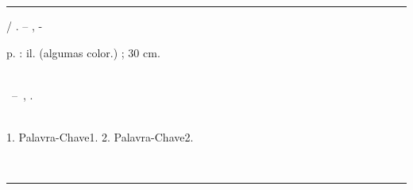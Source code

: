 \documentclass[
	12pt,				%
	oneside,
	a4paper,			%
    sumario=tradicional,%
	chapter=TITLE,		%
	english,			%
	french,				%
	spanish,			%
	brazil,				%
	]{abntex2}
\begin{document}
\frenchspacing 


\imprimircapa

\imprimirfolhaderosto*


%
%     
\begin{fichacatalografica}
	\vspace*{\fill}					%
	\hrule							%
	\begin{center}					%
	\begin{minipage}[c]{12.5cm}		%
	
	\imprimirautor
	
	\hspace{0.5cm} \imprimirtitulo  / \imprimirautor. --
	\imprimirlocal, \imprimirdata-
	
	\hspace{0.5cm} \pageref{LastPage} p. : il. (algumas color.) ; 30 cm.\\
	
	\hspace{0.5cm} \imprimirorientadorRotulo~\imprimirorientador\\
	
	\hspace{0.5cm}
	\parbox[t]{\textwidth}{\imprimirtipotrabalho~--~\imprimirinstituicao,
	\imprimirdata.}\\
	
	\hspace{0.5cm}
		1. Palavra-Chave1.
		2. Palavra-Chave2.
	
	\hspace{8.75cm}\\
	
	\end{minipage}
	\end{center}
	\hrule
\end{fichacatalografica}
\end{document}
